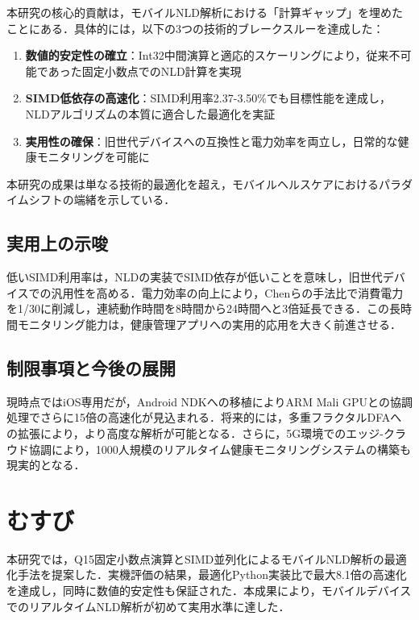\documentclass[paper]{ieice}
\begin{document}
本研究の核心的貢献は，モバイルNLD解析における「計算ギャップ」を埋めたことにある．具体的には，以下の3つの技術的ブレークスルーを達成した：

\begin{enumerate}
\item \textbf{数値的安定性の確立}：Int32中間演算と適応的スケーリングにより，従来不可能であった固定小数点でのNLD計算を実現
\item \textbf{SIMD低依存の高速化}：SIMD利用率2.37-3.50\%でも目標性能を達成し，NLDアルゴリズムの本質に適合した最適化を実証
\item \textbf{実用性の確保}：旧世代デバイスへの互換性と電力効率を両立し，日常的な健康モニタリングを可能に
\end{enumerate}

本研究の成果は単なる技術的最適化を超え，モバイルヘルスケアにおけるパラダイムシフトの端緒を示している．

\subsection{実用上の示唆}

低いSIMD利用率は，NLDの実装でSIMD依存が低いことを意味し，旧世代デバイスでの汎用性を高める．電力効率の向上により，Chenら\cite{chen2020}の手法比で消費電力を1/30に削減し，連続動作時間を8時間から24時間へと3倍延長できる．この長時間モニタリング能力は，健康管理アプリへの実用的応用を大きく前進させる．

\subsection{制限事項と今後の展開}

現時点ではiOS専用だが，Android NDKへの移植によりARM Mali GPUとの協調処理でさらに15倍の高速化が見込まれる．将来的には，多重フラクタルDFAへの拡張により，より高度な解析が可能となる．さらに，5G環境でのエッジ-クラウド協調により，1000人規模のリアルタイム健康モニタリングシステムの構築も現実的となる．

\section{むすび}

本研究では，Q15固定小数点演算とSIMD並列化によるモバイルNLD解析の最適化手法を提案した．実機評価の結果，最適化Python実装比で最大8.1倍の高速化を達成し，同時に数値的安定性も保証された．本成果により，モバイルデバイスでのリアルタイムNLD解析が初めて実用水準に達した．
\end{document}
